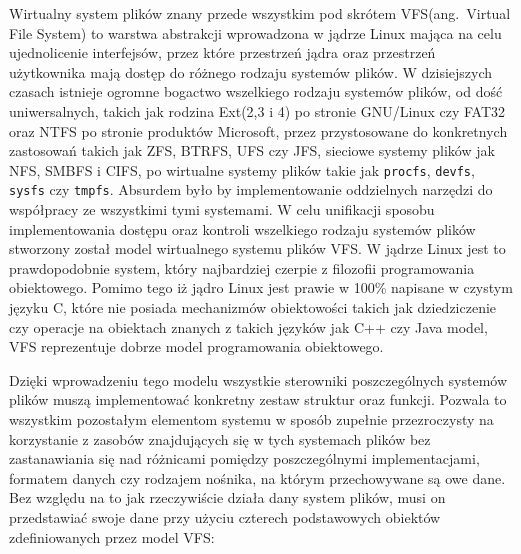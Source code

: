 \documentclass[11pt]{scrartcl}
\begin{document}
Wirtualny system plików znany przede wszystkim pod skrótem VFS(ang.\ Virtual File System) to warstwa abstrakcji wprowadzona w jądrze Linux mająca na celu ujednolicenie interfejsów, przez które przestrzeń jądra oraz przestrzeń użytkownika mają dostęp do różnego rodzaju systemów plików. W dzisiejszych czasach istnieje ogromne bogactwo wszelkiego rodzaju systemów plików, od dość uniwersalnych, takich jak rodzina Ext(2,3 i 4) po stronie GNU/Linux czy FAT32 oraz NTFS po stronie produktów Microsoft, przez przystosowane do konkretnych zastosowań takich jak ZFS, BTRFS, UFS czy JFS, sieciowe systemy plików jak NFS, SMBFS i CIFS, po wirtualne systemy plików takie jak \texttt{procfs}, \texttt{devfs}, \texttt{sysfs} czy \texttt{tmpfs}. Absurdem było by implementowanie oddzielnych narzędzi do współpracy ze wszystkimi tymi systemami. W celu unifikacji sposobu implementowania dostępu oraz kontroli wszelkiego rodzaju systemów plików stworzony został model wirtualnego systemu plików VFS\@. W jądrze Linux jest to prawdopodobnie system, który najbardziej czerpie z filozofii programowania obiektowego. Pomimo tego iż jądro Linux jest prawie w 100\% napisane w czystym języku C, które nie posiada mechanizmów obiektowości takich jak dziedziczenie czy operacje na obiektach znanych z takich języków jak C++ czy Java model, VFS reprezentuje dobrze model programowania obiektowego.

Dzięki wprowadzeniu tego modelu wszystkie sterowniki poszczególnych systemów plików muszą implementować konkretny zestaw struktur oraz funkcji. Pozwala to wszystkim pozostałym elementom systemu w sposób zupełnie przezroczysty na korzystanie z zasobów znajdujących się w tych systemach plików bez zastanawiania się nad różnicami pomiędzy poszczególnymi implementacjami, formatem danych czy rodzajem nośnika, na którym przechowywane są owe dane. Bez względu na to jak rzeczywiście działa dany system plików, musi on przedstawiać swoje dane przy użyciu czterech podstawowych obiektów zdefiniowanych przez model VFS:
\end{document}
